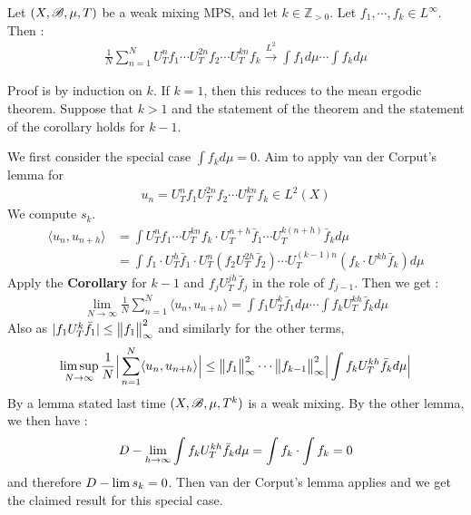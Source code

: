\documentclass[10pt,a4paper]{report}
\newenvironment{proof}
{\begin{changemargin}{1cm}{0.5cm} 
	}%
	{\end{changemargin}
}
\begin{document}
\thm Let $(X,\mathscr{B}, \mu, T)$ be a weak mixing MPS, and let $k\in \mathbb{Z}_{>0}$. Let $f_1,\cdots,f_k \in L^{\infty}$. Then :
\begin{align*}
\frac{1}{N} \sum_{n=1}^N U^n_T f_1 \cdots U^{2n}_T f_2 \cdots U^{kn}_T f_k \xrightarrow{L^2} \int f_1 d\mu \cdots \int f_{k} d\mu
\end{align*}
\begin{proof}
\pf Proof is by induction on $k$. If $k=1$, then this reduces to the mean ergodic theorem. Suppose that $k>1$ and the statement of the theorem and the statement of the corollary holds for $k-1$.

\quad We first consider the special case $\int f_{k} d\mu =0$. Aim to apply van der Corput's lemma for
\begin{align*}
u_n = U^n_T f_1 U^{2n}_T f_2 \cdots U^{kn}_T f_k \in L^2(X)
\end{align*}
We compute $s_k$.
\begin{align*}
\langle u_n, u_{n+h} \rangle &= \int U^n_T f_1 \cdots U^{kn}_T f_k \cdot U^{n+h}_T \bar{f}_1 \cdots U^{k(n+h)}_T \bar{f}_k d\mu \\
&= \int f_1 \cdot U^h_T \bar{f}_1 \cdot U^n_T (f_2 U^{2h}_T \bar{f}_2) \cdots U^{(k-1)n}_T (f_k \cdot U^{kh} \bar{f}_k) d\mu
\end{align*}
Apply the \textbf{Corollary} for $k-1$ and $f_j U_T^{jh} \bar{f}_j$ in the role of $f_{j-1}$. Then we get :
\begin{align*}
\lim_{N\rightarrow \infty} \frac{1}{N} \sum_{n=1}^N \langle u_n, u_{n+h} \rangle = \int f_1 U^k_T \bar{f}_1 d\mu \cdots \int f_k U^{kh}_T \bar{f}_k d\mu
\end{align*}
Also as $|f_1 U^k_T \bar{f}_1| \leq \bigl\lVert f_1\bigr\rVert_{\infty}^2$ and similarly for the other terms,
\begin{align*}
\limsup_{N\rightarrow \infty} \frac{1}{N} \Big| \sum_{n=1}^N \langle u_n, u_{n+h} \rangle \Big| \leq \bigl\lVert f_1\bigr\rVert_{\infty}^2  \cdots \bigl\lVert f_{k-1}\bigr\rVert_{\infty}^2 \Big| \int f_k U^{kh}_T \bar{f}_{k} d\mu \Big|
\end{align*}
By a lemma stated last time $(X,\mathscr{B}, \mu, T^k)$ is a weak mixing. By the other lemma, we then have :
\begin{align*}
D-\lim_{h\rightarrow \infty} \int f_k U^{kh}_T \bar{f}_k d\mu = \int f_k \cdot \int f_k = 0
\end{align*}
and therefore $D-\lim s_k =0$. Then van der Corput's lemma applies and we get the claimed result for this special case.
\s


\end{proof}
\end{document}
